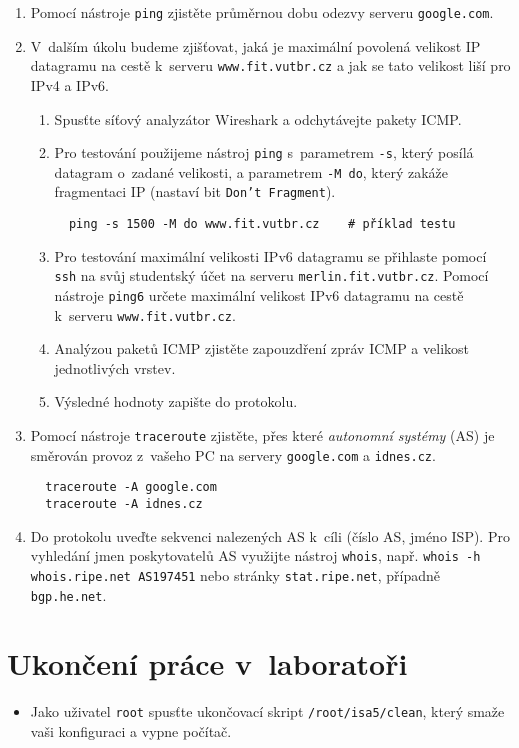 \documentclass[a4paper,11pt]{article}
\begin{document}
\begin{enumerate}
  \item Pomocí nástroje \texttt{ping} zjistěte průměrnou dobu odezvy serveru \texttt{google.com}.
  \item V~dalším úkolu budeme zjišťovat, jaká je maximální povolená velikost IP datagramu na cestě k~serveru \texttt{www.fit.vutbr.cz} a jak se tato velikost liší pro IPv4 a IPv6.
  \begin{enumerate}
    \item Spusťte síťový analyzátor Wireshark a odchytávejte pakety ICMP.
    \item Pro testování použijeme nástroj {\tt ping} s~parametrem \texttt{-s}, který posílá datagram o~zadané velikosti, a parametrem \texttt{-M do}, který zakáže fragmentaci IP (nastaví bit \texttt{Don't Fragment}).
\begin{verbatim}
  ping -s 1500 -M do www.fit.vutbr.cz    # příklad testu
\end{verbatim}
    \item Pro testování maximální velikosti IPv6 datagramu se přihlaste pomocí {\tt ssh} na svůj studentský účet na serveru {\tt merlin.fit.vutbr.cz}. Pomocí nástroje {\tt ping6} určete maximální velikost IPv6 datagramu na cestě k~serveru \texttt{www.fit.vutbr.cz}.
    \item Analýzou paketů ICMP  zjistěte zapouzdření zpráv ICMP a velikost jednotlivých vrstev.
    \item Výsledné hodnoty zapište do protokolu.
  \end{enumerate}
  \item Pomocí nástroje \texttt{traceroute} zjistěte, přes které {\em autonomní systémy} (AS) je směrován provoz z~vašeho PC na servery \texttt{google.com} a \texttt{idnes.cz}.
\begin{verbatim}
  traceroute -A google.com
  traceroute -A idnes.cz
\end{verbatim}
  \item Do protokolu uveďte sekvenci nalezených AS k~cíli (číslo AS, jméno ISP). Pro vyhledání jmen poskytovatelů AS využijte nástroj {\tt whois}, např. \texttt{whois -h whois.ripe.net AS197451} nebo stránky \texttt{stat.ripe.net}, případně \texttt{bgp.he.net}.
\end{enumerate}

\section*{Ukončení práce v~laboratoři}
\begin{itemize}
  \item Jako uživatel {\tt root} spusťte ukončovací skript {\tt /root/isa5/clean}, který smaže vaši konfiguraci a vypne počítač.
\end{itemize}
\end{document}
